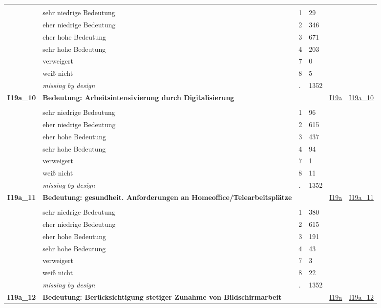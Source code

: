 \begin{longtable}{| L{2.45cm} | L{6cm} | C{1.5cm} | R{1cm} | C{2.25cm} | C{2.25cm} |}
   &  &  &  &  &  \\ 
   & sehr niedrige Bedeutung & 1 & 29 &  &  \\ 
   & eher niedrige Bedeutung & 2 & 346 &  &  \\ 
   & eher hohe Bedeutung & 3 & 671 &  &  \\ 
   & sehr hohe Bedeutung & 4 & 203 &  &  \\ 
   & verweigert & 7 & 0 &  &  \\ 
   & weiß nicht & 8 & 5 &  &  \\ 
   & \textit{missing by design} & \textit{.} & 1352 &  &  \\ 
   \midrule
\textbf{I19a\_10}\label{var:I19a:10} & \textbf{Bedeutung: Arbeitsintensivierung durch Digitalisierung} &  &  & \hyperref[I19a]{I19a} & \hyperref[var:suf:I19a:10]{I19a\_10} \\ 
   &  &  &  &  &  \\ 
   & sehr niedrige Bedeutung & 1 & 96 &  &  \\ 
   & eher niedrige Bedeutung & 2 & 615 &  &  \\ 
   & eher hohe Bedeutung & 3 & 437 &  &  \\ 
   & sehr hohe Bedeutung & 4 & 94 &  &  \\ 
   & verweigert & 7 & 1 &  &  \\ 
   & weiß nicht & 8 & 11 &  &  \\ 
   & \textit{missing by design} & \textit{.} & 1352 &  &  \\ 
   \midrule
\textbf{I19a\_11}\label{var:I19a:11} & \textbf{Bedeutung: gesundheit. Anforderungen an Homeoffice/Telearbeitsplätze} &  &  & \hyperref[I19a]{I19a} & \hyperref[var:suf:I19a:11]{I19a\_11} \\ 
   &  &  &  &  &  \\ 
   & sehr niedrige Bedeutung & 1 & 380 &  &  \\ 
   & eher niedrige Bedeutung & 2 & 615 &  &  \\ 
   & eher hohe Bedeutung & 3 & 191 &  &  \\ 
   & sehr hohe Bedeutung & 4 & 43 &  &  \\ 
   & verweigert & 7 & 3 &  &  \\ 
   & weiß nicht & 8 & 22 &  &  \\ 
   & \textit{missing by design} & \textit{.} & 1352 &  &  \\ 
   \midrule
\textbf{I19a\_12}\label{var:I19a:12} & \textbf{Bedeutung: Berücksichtigung stetiger Zunahme von Bildschirmarbeit} &  &  & \hyperref[I19a]{I19a} & \hyperref[var:suf:I19a:12]{I19a\_12} \\ 

\end{longtable}
